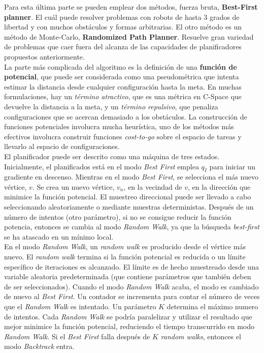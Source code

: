 \documentclass[a4paper, fontsize=11pt]{scrartcl} %
\numberwithin{equation}{section} %
\numberwithin{figure}{section} %
\numberwithin{table}{section} %
\begin{document}
	Para esta última parte se pueden emplear dos métodos, fuerza bruta, \textbf{Best-First planner}. El cuál puede resolver problemas con robots de hasta 3 grados de libertad y con muchos obstáculos y formas arbitrarias. El otro método es un método de Monte-Carlo, \textbf{Randomized Path Planner}. Resuelve gran variedad de problemas que caer fuera del alcanza de las capacidades de planificadores propuestos anteriormente.\\
	
	La parte más complicada del algoritmo es la definición de una \textbf{función de potencial}, que puede ser considerada como una pseudométrica que intenta estimar la distancia desde cualquier configuración hasta la meta. En muchas formulaciones, hay un \textit{término atractivo}, que es una métrica en C-Space que devuelve la distancia a la meta, y un \textit{término repulsivo}, que penaliza configuraciones que se acercan demasiado a los obstáculos. La construcción de funciones potenciales involucra mucha heurística, uno de los métodos más efectivos involucra construir funciones \textit{cost-to-go} sobre el espacio de tareas y llevarlo al espacio de configuraciones.\\
	
	El planificador puede ser descrito como una máquina de tres estados. Inicialmente, el planificados está en el modo \textit{Best First} emplea $q_I$ para iniciar un gradiente en descenso. Mientras en el modo \textit{Best First}, se selecciona el más nuevo vértice, $v$. Se crea un nuevo vértice, $v_n$, en la vecindad de $v$, en la dirección que minimice la función potencial. El muestreo direccional puede ser llevado a cabo seleccionando aleatoriamente o mediante muestras deterministas. Después de un número de intentos (otro parámetro), si no se consigue reducir la función potencia, entonces se cambia al modo \textit{Random Walk}, ya que la búsqueda \textit{best-first} se ha atascado en un mínimo local.\\
	
	En el modo \textit{Random Walk}, un \textit{random walk} es producido desde el vértice más nuevo. El \textit{random walk} termina si la función potencial es reducida o un límite específico de iteraciones es alcanzado. El límite es de hecho muestreado desde una variable aleatoria predeterminada (que contiene parámetros que también deben de ser seleccionados). Cuando el modo \textit{Random Walk} acaba, el modo es cambiado de nuevo al \textit{Best First}. Un contador se incrementa para contar el número de veces que el \textit{Random Walk} es intentado. Un parámetro $K$ determina el máximo numero de intentos. Cada \textit{Random Walk} se podría paralelizar y utilizar el resultado que mejor minimice la función potencial, reduciendo el tiempo transcurrido en modo \textit{Random Walk}. Si el \textit{Best First} falla después de $K$ \textit{random walks}, entonces el modo \textit{Backtrack} entra.\\
	
\end{document}
